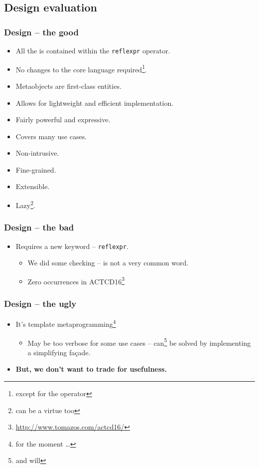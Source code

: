 \documentclass[compress,table,xcolor=table]{beamer}
\begin{document}
\subsection{Design evaluation}
\begin{frame}
\frametitle{Design -- the good}
  \large
  \begin{itemize}
    \item All the  is contained within the \texttt{reflexpr} operator.
    \item No changes to the core language required\footnote{except for the operator}.
    \item Metaobjects are first-class entities.
    \item Allows for lightweight and efficient implementation.
    \item Fairly powerful and expressive.
    \item Covers many use cases.
    \item Non-intrusive.
    \item Fine-grained.
    \item Extensible.
    \item Lazy\footnote{can be a virtue too}.
  \end{itemize}
\end{frame}

\begin{frame}
\frametitle{Design -- the bad}
  \large
  \begin{itemize}
    \item Requires a new keyword -- \texttt{reflexpr}.
    \begin{itemize}
      \item We did some checking --  is not a very common word.
      \item Zero occurrences in ACTCD16\footnote{\url{http://www.tomazos.com/actcd16/}}
    \end{itemize}
  \end{itemize}
\end{frame}

\begin{frame}
\frametitle{Design -- the ugly}
  \large
  \begin{itemize}
    \item It's template metaprogramming\footnote{for the moment \ldots}
    \begin{itemize}
      \item May be too verbose for some use cases -- can\footnote{and will} be
      solved by implementing a simplifying fa\c{c}ade.
    \end{itemize}
    \item \textbf{But, we don't want to trade  for usefulness.}
  \end{itemize}
\end{frame}
\end{document}
